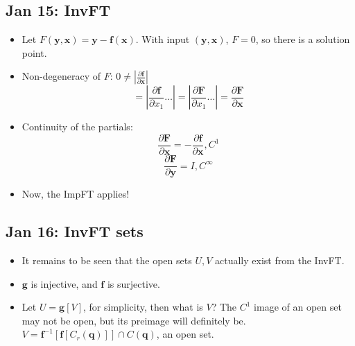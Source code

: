 \documentclass[10pt, oneside]{article}
\newcommand{\del}{\partial}
\renewcommand{\vec}[1]{\mathbf{#1}}
\newcommand{\vecf}[1]{\boldsymbol{#1}}
\begin{document}
\subsection{Jan 15: InvFT}
\begin{itemize}
    \item Let $F(\vec{y},\vec{x}) = \vec{y} - \vecf{f}(\vec{x})$. With input $(\vec{y},\vec{x})$, $F = 0$, so there is a solution point.
    \item Non-degeneracy of $F$: $0 \neq \left| \frac{\del \vecf{f}}{\del \vec{x}} \right|$
        \[= \left| \frac{\del \vecf{f}}{\del x_1} \hdots \right| = \left| \frac{\del \vecf{F}}{\del x_1} \hdots \right| = \frac{\del \vecf{F}}{\del \vec{x}}\]
    \item Continuity of the partials:
        \[\frac{\del \vecf{F}}{\del \vec{x}} = - \frac{\del \vecf{f}}{\del \vec{x}}, C^1\]
        \[\frac{\del \vecf{F}}{\del \vec{y}} = I, C^\infty\]
    \item Now, the ImpFT applies!
\end{itemize}

\subsection{Jan 16: InvFT sets}
\begin{itemize}
    \item It remains to be seen that the open sets $U, V$ actually exist from the InvFT.
    \item $\vecf{g}$ is injective, and $\vecf{f}$ is surjective.
    \item Let $U = \vecf{g}[V]$, for simplicity, then what is $V$? The $C^1$ image of an open set may not be open, but its preimage will definitely be. $V = \vecf{f}^{-1}[\vecf{f}[C_r(\vec{q})]] \cap C(\vec{q})$, an open set.
\end{itemize}
\end{document}
